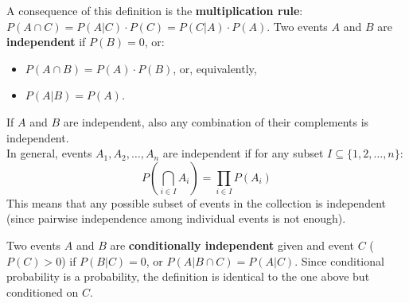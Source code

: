 A consequence of this definition is the \textbf{multiplication rule}: $P(A \cap C) = P(A|C) \cdot P(C) = P(C|A) \cdot P(A)$.
Two events $A$ and $B$ are \textbf{independent} if $P(B) = 0$, or:
\begin{itemize}[itemsep=1pt]
    \item $P(A \cap B) = P(A) \cdot P(B)$, or, equivalently,
    \item $P(A|B) = P(A)$.
\end{itemize}
If $A$ and $B$ are independent, also any combination of their complements is independent. \\
In general, events $A_1, A_2, \dots, A_n$ are independent if for any subset $I \subseteq \{1, 2, \dots, n\}$:
\begin{equation*}
    P\left(\bigcap_{i \in I} A_i\right) = \prod_{i \in I} P(A_i)
\end{equation*}
This means that any possible subset of events in the collection is independent (since pairwise independence among individual events is not enough).

Two events $A$ and $B$ are \textbf{conditionally independent} given and event $C$ ($P(C) > 0$) if $P(B|C) = 0$, or $P(A|B \cap C) = P(A|C)$. Since conditional probability is a probability, the definition is identical to the one above but conditioned on $C$.